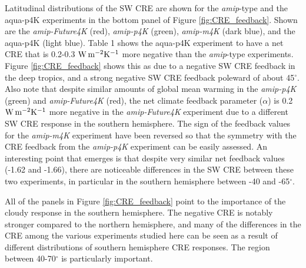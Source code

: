 \documentclass[draft]{agujournal2019}
\begin{document}
Latitudinal distributions of the SW CRE are shown for the \textit{amip}-type and the aqua-p4K experiments in the bottom 
panel of Figure \ref{fig:CRE_feedback}.  Shown are the \textit{amip-Future4K} (red), \textit{amip-p4K} (green), 
\textit{amip-m4K} (dark blue), and the aqua-p4K (light blue).   Table 1 shows the aqua-p4K experiment to have a net CRE 
that is 0.2-0.3  $\rm{W\, m^{-2} K^{-1}}$ more negative than the \textit{amip}-type experiments.  Figure 
\ref{fig:CRE_feedback} shows this as due to a negative SW CRE feedback in the deep tropics, and a strong negative 
SW CRE feedback poleward of about 45$^{\circ}$.  
Also note that despite similar amounts of global mean warming in the \textit{amip-p4K} (green) and 
\textit{amip-Future4K} (red), the net climate feedback parameter ($\alpha$) is 0.2 $\rm{W\, m^{-2} K^{-1}}$ more negative
in the \textit{amip-Future4K} experiment due to a different SW CRE response in the southern hemisphere.  
The sign of the feedback values for the \textit{amip-m4K} experiment have been reversed so that the symmetry with the CRE
feedback from the \textit{amip-p4K} experiment can be easily assessed.  An interesting point that emerges is that 
despite very similar net feedback values (-1.62 and -1.66), there are noticeable differences in the SW CRE between 
these two experiments, in particular in the southern hemisphere between -40 and -65$^{\circ}$.

All of the panels in Figure \ref{fig:CRE_feedback} point to the importance of the cloudy response in the southern 
hemisphere.   The negative CRE is notably stronger compared to the northern hemisphere, and many of the differences 
in the CRE among the various experiments studied here can be seen as a result of different distributions of southern 
hemisphere CRE responses.  The region between 40-70$^{\circ}$ is particularly important.  

\end{document}
